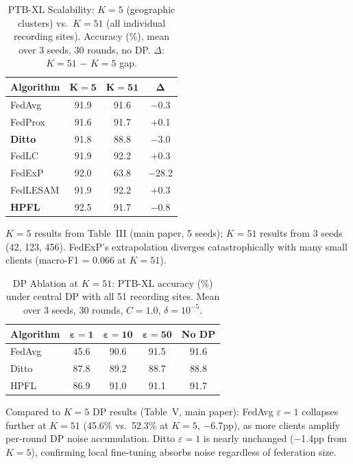 \documentclass[conference]{IEEEtran}
\begin{document}
\begin{table}[htbp]
\centering
\caption{PTB-XL Scalability: $K{=}5$ (geographic clusters) vs.\ $K{=}51$ (all individual recording sites). Accuracy (\%), mean over 3 seeds, 30 rounds, no DP. $\Delta$: $K{=}51$ $-$ $K{=}5$ gap.}
\label{tab:k52_nodp}
\small
\begin{tabular}{lccc}
\toprule
\textbf{Algorithm} & $\boldsymbol{K{=}5}$ & $\boldsymbol{K{=}51}$ & $\boldsymbol{\Delta}$ \\
\midrule
FedAvg & 91.9 & 91.6 & $-$0.3 \\
FedProx & 91.6 & 91.7 & +0.1 \\
\textbf{Ditto} & 91.8 & 88.8 & $-$3.0 \\
FedLC & 91.9 & 92.2 & +0.3 \\
FedExP & 92.0 & 63.8 & $-$28.2 \\
FedLESAM & 91.9 & 92.2 & +0.3 \\
\textbf{HPFL} & 92.5 & 91.7 & $-$0.8 \\
\bottomrule
\end{tabular}

\vspace{1mm}
\footnotesize{$K{=}5$ results from Table~III (main paper, 5 seeds); $K{=}51$ results from 3 seeds (42, 123, 456). FedExP's extrapolation diverges catastrophically with many small clients (macro-F1 = 0.066 at $K{=}51$).}
\end{table}

\begin{table}[htbp]
\centering
\caption{DP Ablation at $K{=}51$: PTB-XL accuracy (\%) under central DP with all 51 recording sites. Mean over 3 seeds, 30 rounds, $C{=}1.0$, $\delta{=}10^{-5}$.}
\label{tab:k52_dp}
\small
\begin{tabular}{lcccc}
\toprule
\textbf{Algorithm} & $\boldsymbol{\varepsilon{=}1}$ & $\boldsymbol{\varepsilon{=}10}$ & $\boldsymbol{\varepsilon{=}50}$ & \textbf{No DP} \\
\midrule
FedAvg & 45.6 & 90.6 & 91.5 & 91.6 \\
Ditto & 87.8 & 89.2 & 88.7 & 88.8 \\
HPFL & 86.9 & 91.0 & 91.1 & 91.7 \\
\bottomrule
\end{tabular}

\vspace{1mm}
\footnotesize{Compared to $K{=}5$ DP results (Table~V, main paper): FedAvg $\varepsilon{=}1$ collapses further at $K{=}51$ (45.6\% vs.\ 52.3\% at $K{=}5$, $-$6.7pp), as more clients amplify per-round DP noise accumulation. Ditto $\varepsilon{=}1$ is nearly unchanged ($-$1.4pp from $K{=}5$), confirming local fine-tuning absorbs noise regardless of federation size.}
\end{table}
\end{document}
